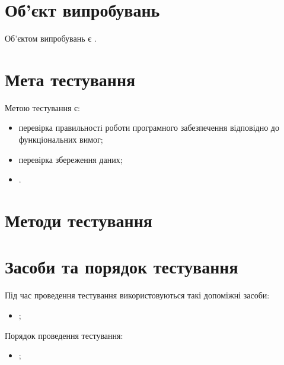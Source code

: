 \documentclass{kpi-thesis}
\begin{document}
\mainmatter
\tableofcontents

\section{Об'єкт випробувань}
Об'єктом випробувань є .

\section{Мета тестування}
Метою тестування є:
\begin{itemize}
\item перевірка правильності роботи програмного забезпечення відповідно до функціональних вимог;
\item перевірка збереження даних;
\item {}.
\end{itemize}

\section{Методи тестування}

\section{Засоби та порядок тестування}
Під час проведення тестування використовуються такі допоміжні засоби:
\begin{itemize}
\item {};
\end{itemize}

Порядок проведення тестування:
\begin{itemize}
\item {};
\end{itemize}
\end{document}

